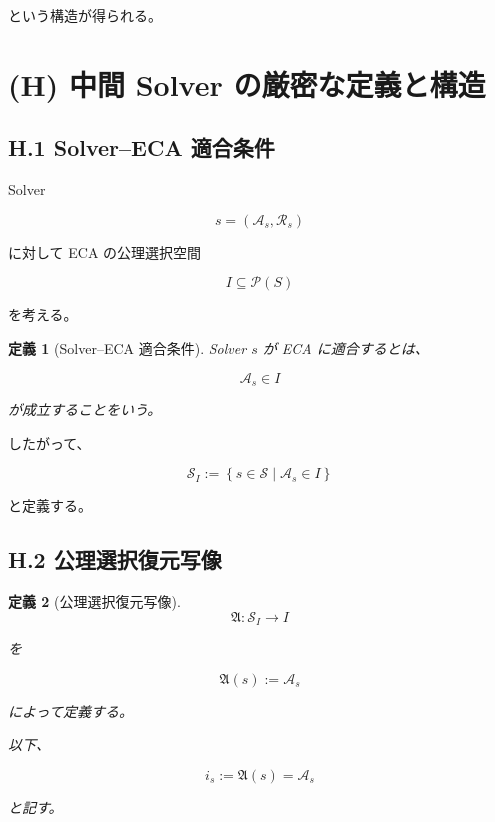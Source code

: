 \documentclass[a4paper,11pt]{article}
\newtheorem{definition}{定義}[section]
\newcommand{\Solver}{\mathcal{S}}
\newcommand{\Aset}{\mathcal{A}}
\newcommand{\Rset}{\mathcal{R}}
\begin{document}
という構造が得られる。


\section{(H) 中間 Solver の厳密な定義と構造}

\subsection{H.1 Solver--ECA 適合条件}

Solver

\begin{equation}
    s=(\Aset_s,\Rset_s)
\end{equation}

に対して ECA の公理選択空間

\begin{equation}
    I\subseteq\mathcal{P}(S)
\end{equation}

を考える。

\begin{definition}[Solver--ECA 適合条件]
Solver $s$ が ECA に適合するとは、

\begin{equation}
    \Aset_s\in I
\end{equation}

が成立することをいう。
\end{definition}

したがって、

\begin{equation}
    \Solver_I
    :=
    \left\{
        s\in\Solver
        \mid
        \Aset_s\in I
    \right\}
\end{equation}

と定義する。


\subsection{H.2 公理選択復元写像}

\begin{definition}[公理選択復元写像]
\begin{equation}
    \mathfrak{A}:
    \Solver_I\to I
\end{equation}

を

\begin{equation}
    \boxed{
        \mathfrak{A}(s)
        :=
        \Aset_s
    }
\end{equation}

によって定義する。

以下、

\begin{equation}
    i_s
    :=
    \mathfrak{A}(s)
    =
    \Aset_s
\end{equation}

と記す。
\end{definition}
\end{document}
